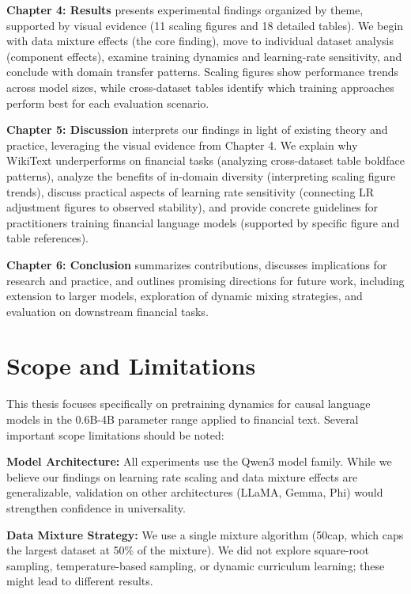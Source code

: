 \textbf{Chapter 4: Results} presents experimental findings organized by theme, supported by visual evidence (11 scaling figures and 18 detailed tables). We begin with data mixture effects (the core finding), move to individual dataset analysis (component effects), examine training dynamics and learning-rate sensitivity, and conclude with domain transfer patterns. Scaling figures show performance trends across model sizes, while cross-dataset tables identify which training approaches perform best for each evaluation scenario.

\textbf{Chapter 5: Discussion} interprets our findings in light of existing theory and practice, leveraging the visual evidence from Chapter 4. We explain why WikiText underperforms on financial tasks (analyzing cross-dataset table boldface patterns), analyze the benefits of in-domain diversity (interpreting scaling figure trends), discuss practical aspects of learning rate sensitivity (connecting LR adjustment figures to observed stability), and provide concrete guidelines for practitioners training financial language models (supported by specific figure and table references).

\textbf{Chapter 6: Conclusion} summarizes contributions, discusses implications for research and practice, and outlines promising directions for future work, including extension to larger models, exploration of dynamic mixing strategies, and evaluation on downstream financial tasks.

\section{Scope and Limitations}

This thesis focuses specifically on pretraining dynamics for causal language models in the 0.6B-4B parameter range applied to financial text. Several important scope limitations should be noted:

\textbf{Model Architecture:} All experiments use the Qwen3 model family. While we believe our findings on learning rate scaling and data mixture effects are generalizable, validation on other architectures (LLaMA, Gemma, Phi) would strengthen confidence in universality.

\textbf{Data Mixture Strategy:} We use a single mixture algorithm (50cap, which caps the largest dataset at 50\% of the mixture). We did not explore square-root sampling, temperature-based sampling, or dynamic curriculum learning; these might lead to different results.

